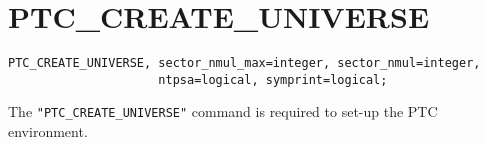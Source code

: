 \section{PTC\_CREATE\_UNIVERSE}

\begin{verbatim}
PTC_CREATE_UNIVERSE, sector_nmul_max=integer, sector_nmul=integer,
                     ntpsa=logical, symprint=logical;
\end{verbatim}


The \texttt{"PTC\_CREATE\_UNIVERSE"} command is required to set-up the
PTC environment.  
     

